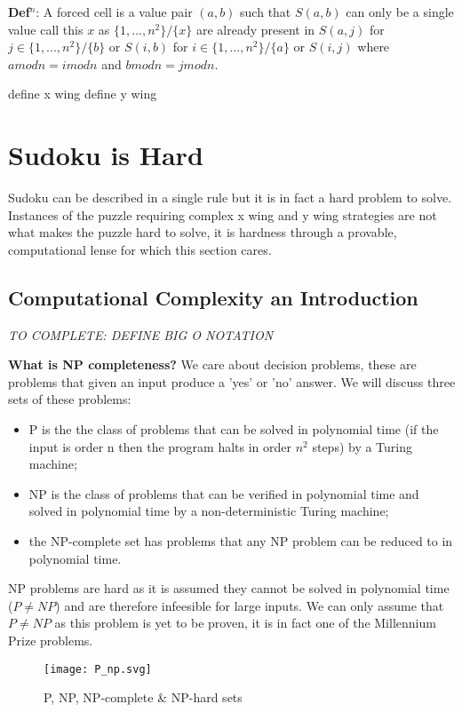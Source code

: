 \documentclass[a4paper,12pt]{article}
\begin{document}
\textbf{Def$^n$}: A forced cell is a value pair $(a,b)$ such that $S(a,b)$ can only be a single value call this $x$ as $\{1,...,n^2\}/\{x\}$ are already present in $S(a,j)$ for $j \in\{1,...,n^2\}/\{b\}$ or $S(i,b)$ for $i \in\{1,...,n^2\}/\{a\}$ or $S(i,j)$ where $a mod n = i mod n$ and $b mod n  =  j mod n$.

define x wing
define y wing
\section{Sudoku is Hard}

Sudoku can be described in a single rule but it is in fact a hard problem to solve. Instances of the puzzle requiring complex x wing and y wing strategies are not what makes the puzzle hard to solve, it is hardness through a provable, computational lense for which this section cares. 
		
\subsection{Computational Complexity an Introduction}
	
	 \textit{TO COMPLETE: DEFINE BIG O NOTATION}
	 
\textbf{What is NP completeness?}
We care about decision problems, these are problems that given an input  produce a 'yes' or 'no' answer. We will discuss three sets of these problems: 
\begin{itemize}
	\item{P is the the class of problems that can be solved in polynomial time (if the input is order n then the program halts in order $n^2$ steps) by a Turing machine;} 
	\item{NP is the class of problems that can be verified in polynomial time and solved in polynomial time by a non-deterministic Turing machine;} 
	\item{the NP-complete set has problems that any NP problem can be reduced to in polynomial time.} 
\end{itemize}

NP problems are hard as it is assumed they cannot be solved in polynomial time ($P \neq NP$) and are therefore infeesible for large inputs. We can only assume that $P\neq NP$ as this problem is yet to be proven, it is in fact one of the Millennium Prize problems.

\begin{figure}[h!]
	\begin{center}
		\texttt{[image: P\_np.svg]}
	\end{center}
	\caption{P, NP, NP-complete \& NP-hard sets \cite{P_NP_Figure}}
\end{figure}
\end{document}
